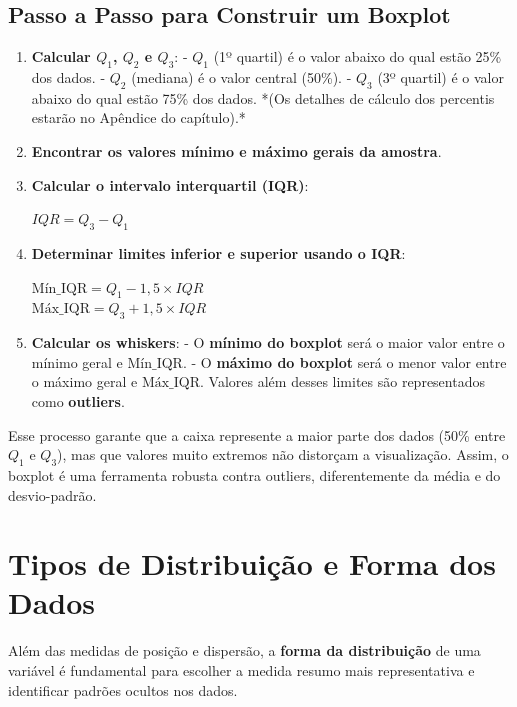 \subsection*{Passo a Passo para Construir um Boxplot}
\begin{enumerate}[leftmargin=*]
  \item \textbf{Calcular $Q_1$, $Q_2$ e $Q_3$}:  
  - $Q_1$ (1º quartil) é o valor abaixo do qual estão 25\% dos dados.  
  - $Q_2$ (mediana) é o valor central (50\%).  
  - $Q_3$ (3º quartil) é o valor abaixo do qual estão 75\% dos dados.  
  *(Os detalhes de cálculo dos percentis estarão no Apêndice do capítulo).*
  
  \item \textbf{Encontrar os valores mínimo e máximo gerais da amostra}.  

  \item \textbf{Calcular o intervalo interquartil (IQR)}:
  \begin{FormulaBox}
  $IQR = Q_3 - Q_1$
  \end{FormulaBox}

  \item \textbf{Determinar limites inferior e superior usando o IQR}:
  \begin{FormulaBox}
  $\text{Mín\_IQR} = Q_1 - 1,5 \times IQR$ \\[4pt]
  $\text{Máx\_IQR} = Q_3 + 1,5 \times IQR$
  \end{FormulaBox}

  \item \textbf{Calcular os whiskers}:  
  - O \textbf{mínimo do boxplot} será o maior valor entre o mínimo geral e $\text{Mín\_IQR}$.  
  - O \textbf{máximo do boxplot} será o menor valor entre o máximo geral e $\text{Máx\_IQR}$.  
  Valores além desses limites são representados como \textbf{outliers}.
\end{enumerate}

Esse processo garante que a caixa represente a maior parte dos dados (50\% entre $Q_1$ e $Q_3$), mas que valores muito extremos não distorçam a visualização.  
Assim, o boxplot é uma ferramenta robusta contra outliers, diferentemente da média e do desvio-padrão.


\section{Tipos de Distribuição e Forma dos Dados}

Além das medidas de posição e dispersão, a \textbf{forma da distribuição} de uma variável é fundamental para escolher a medida resumo mais representativa e identificar padrões ocultos nos dados.

